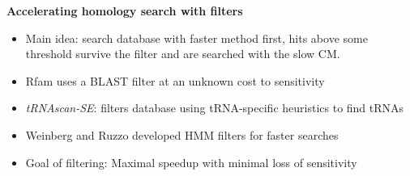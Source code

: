 \documentclass[landscape]{slides}
\begin{document}
\begin{slide}
\large
\begin{center}
\textbf{Accelerating homology search with filters}
\end{center}

\small
\begin{itemize}
\item
  Main idea: search database with faster method first, hits above some threshold survive the filter and are searched with the slow CM.
\item
  Rfam uses a BLAST filter at an unknown cost to sensitivity
\item
  \emph{tRNAscan-SE}: filters database using tRNA-specific heuristics to find tRNAs
\item
  Weinberg and Ruzzo developed HMM filters for faster searches
\item
  Goal of filtering: Maximal speedup with minimal loss of sensitivity
\end{itemize}

\vfill

\end{slide}
\end{document}
